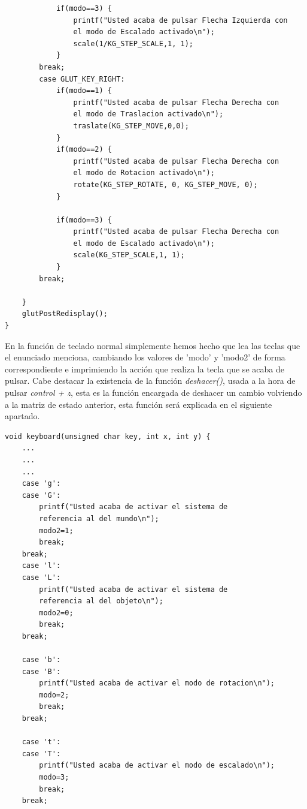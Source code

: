 \documentclass[12pt,a4paper]{article}
\begin{document}
\begin{enumerate}
\begin{lstlisting}
            if(modo==3) {
                printf("Usted acaba de pulsar Flecha Izquierda con 
                el modo de Escalado activado\n");
                scale(1/KG_STEP_SCALE,1, 1);
            }     
        break;
        case GLUT_KEY_RIGHT:
            if(modo==1) {
                printf("Usted acaba de pulsar Flecha Derecha con 
                el modo de Traslacion activado\n");
                traslate(KG_STEP_MOVE,0,0);
            }
            if(modo==2) {
                printf("Usted acaba de pulsar Flecha Derecha con 
                el modo de Rotacion activado\n");
                rotate(KG_STEP_ROTATE, 0, KG_STEP_MOVE, 0);
            }
                
            if(modo==3) {
                printf("Usted acaba de pulsar Flecha Derecha con 
                el modo de Escalado activado\n");
                scale(KG_STEP_SCALE,1, 1);
            }     
        break;
        
    }
    glutPostRedisplay();
}

\end{lstlisting}

En la función de teclado normal simplemente hemos hecho que lea las teclas que el enunciado menciona, cambiando los valores de 'modo' y 'modo2' de forma correspondiente e imprimiendo la acción que realiza la tecla que se acaba de pulsar.\newline
Cabe destacar la existencia de la función \textit{deshacer()}, usada a la hora de pulsar \textit{control + z}, esta es la función encargada de deshacer un cambio volviendo a la matriz de estado anterior, esta función será explicada en el siguiente apartado.

\begin{lstlisting}
void keyboard(unsigned char key, int x, int y) {
    ...
    ...
    ...
    case 'g':
    case 'G':
        printf("Usted acaba de activar el sistema de 
        referencia al del mundo\n");
        modo2=1;
        break;
    break;
    case 'l':
    case 'L':
        printf("Usted acaba de activar el sistema de 
        referencia al del objeto\n");
        modo2=0;
        break;
    break;

    case 'b':
    case 'B':
        printf("Usted acaba de activar el modo de rotacion\n");
        modo=2;
        break;
    break;

    case 't':
    case 'T':
        printf("Usted acaba de activar el modo de escalado\n");
        modo=3;
        break;
    break;


\end{lstlisting}
\end{enumerate}
\end{document}

